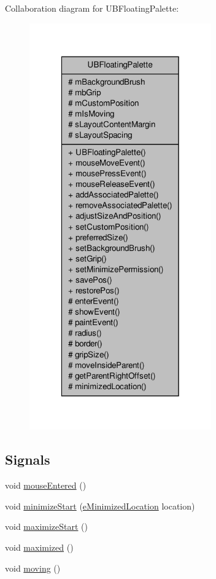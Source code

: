 Collaboration diagram for U\-B\-Floating\-Palette\-:
\nopagebreak
\begin{figure}[H]
\begin{center}
\leavevmode
\includegraphics[width=222pt]{d1/d53/class_u_b_floating_palette__coll__graph}
\end{center}
\end{figure}
\subsection*{Signals}
\begin{DoxyCompactItemize}
\item 
void \hyperlink{class_u_b_floating_palette_a19cc4afd477ddaa4421339056e16c93e}{mouse\-Entered} ()
\item 
void \hyperlink{class_u_b_floating_palette_a7e9182ed71477253b40841ade1074dd2}{minimize\-Start} (\hyperlink{_u_b_floating_palette_8h_ac8adc001960a33bd6c76686f775bd7eb}{e\-Minimized\-Location} location)
\item 
void \hyperlink{class_u_b_floating_palette_a94541890f583373e035733f0d96b6804}{maximize\-Start} ()
\item 
void \hyperlink{class_u_b_floating_palette_aac3ee75b105e3098218fa2ac0dbe66ee}{maximized} ()
\item 
void \hyperlink{class_u_b_floating_palette_adb6a18d46fe0dbca9ea5b6d5bce2af3e}{moving} ()
\end{DoxyCompactItemize}
